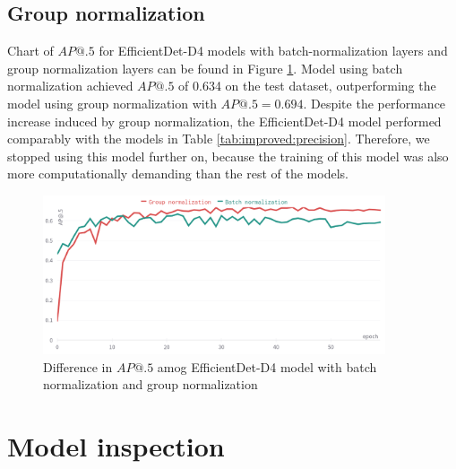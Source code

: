 \subsection{Group normalization}
\label{sec:group_nromalization:res}
Chart of $AP@.5$ for EfficientDet-D4 models with batch-normalization layers and group normalization layers can be found in Figure \ref{fig:batch_group_diff}. Model using batch normalization achieved $AP@.5$ of 0.634 on the test dataset, outperforming the model using group normalization with $AP@.5=0.694$. Despite the performance increase induced by group normalization, the EfficientDet-D4 model performed comparably with the models in Table \ref{tab:improved:precision}. Therefore, we stopped using this model further on, because the training of this model was also more computationally demanding than the rest of the models.
\begin{figure}[H]
    \centering
    \includegraphics[width=0.9\textwidth]{images/group_norm_batch_norm.png}
    \caption{Difference in $AP@.5$ amog EfficientDet-D4 model with batch normalization and group normalization}
    \label{fig:batch_group_diff}
\end{figure}

\section{Model inspection}
\label{sec:model_inspection_results}
